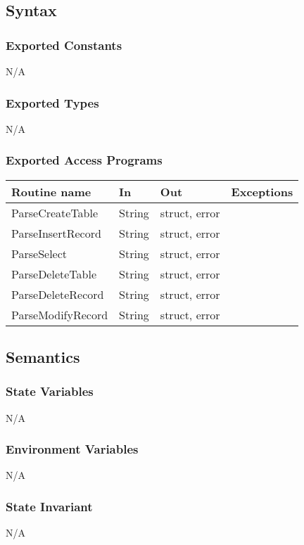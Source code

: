 \documentclass[12pt]{article}
\begin{document}
\subsection {Syntax}

\subsubsection {Exported Constants}
N/A
\subsubsection {Exported Types}
N/A
\subsubsection {Exported Access Programs}

\begin{tabular}{| l | l | l | l |}
\hline
\textbf{Routine name} & \textbf{In} & \textbf{Out} & \textbf{Exceptions}\\
\hline
ParseCreateTable & String & struct, error & \\
\hline
ParseInsertRecord & String & struct, error & \\
\hline
ParseSelect & String & struct, error & \\
\hline
ParseDeleteTable & String & struct, error & \\
\hline
ParseDeleteRecord & String & struct, error & \\
\hline
ParseModifyRecord & String & struct, error & \\
\hline
\end{tabular}

\subsection {Semantics}

\subsubsection {State Variables}

N/A

\subsubsection {Environment Variables}
N/A

\subsubsection {State Invariant}
N/A
\end{document}
